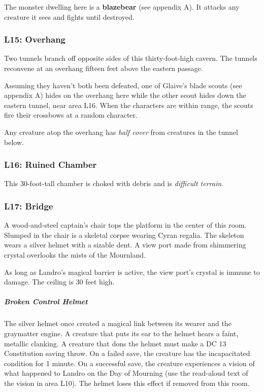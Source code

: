 \documentclass[10pt,a4paper,twoside,bg=print,twocolumn,openany,nodeprecatedcode]{dndbook}
\begin{document}
The monster dwelling here is a \textbf{blazebear} (see appendix A). It attacks any creature it sees and fights until destroyed.

\subsubsection{L15: Overhang}
\begin{DndReadAloud}{}
Two tunnels branch off opposite sides of this thirty-foot-high cavern. The tunnels reconvene at an overhang fifteen feet above the eastern passage.

\end{DndReadAloud}

Assuming they haven't both been defeated, one of Glaive's blade scouts (see appendix A) hides on the overhang here while the other scout hides down the eastern tunnel, near area L16. When the characters are within range, the scouts fire their crossbows at a random character.

Any creature atop the overhang has \textit{half cover} from creatures in the tunnel below.

\subsubsection{L16: Ruined Chamber}
This 30-foot-tall chamber is choked with debris and is \textit{difficult terrain}.

\subsubsection{L17: Bridge}
\begin{DndReadAloud}{}
A wood-and-steel captain's chair tops the platform in the center of this room. Slumped in the chair is a skeletal corpse wearing Cyran regalia. The skeleton wears a silver helmet with a sizable dent. A view port made from shimmering crystal overlooks the mists of the Mournland.

\end{DndReadAloud}

As long as Landro's magical barrier is active, the view port's crystal is immune to damage. The ceiling is 30 feet high.

\subparagraph{Broken Control Helmet}
The silver helmet once created a magical link between its wearer and the graymatter engine. A creature that puts its ear to the helmet hears a faint, metallic clanking. A creature that dons the helmet must make a DC 13 Constitution saving throw. On a failed save, the creature has the incapacitated condition for 1 minute. On a successful save, the creature experiences a vision of what happened to Landro on the Day of Mourning (use the read-aloud text of the vision in area L10). The helmet loses this effect if removed from this room.
\end{document}
